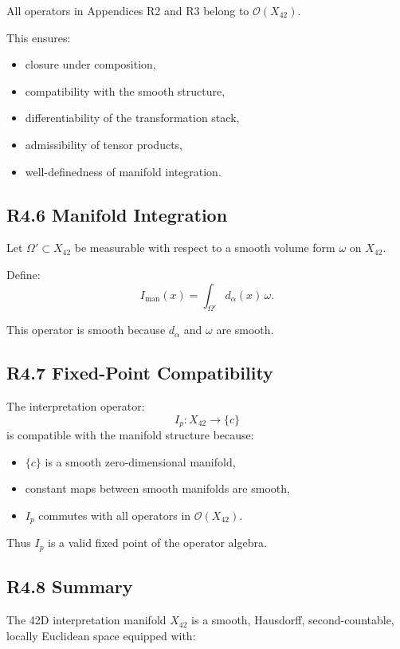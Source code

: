 All operators in Appendices R2 and R3 belong to $\mathcal{O}(X_{42})$.

This ensures:

\begin{itemize}
    \item closure under composition,
    \item compatibility with the smooth structure,
    \item differentiability of the transformation stack,
    \item admissibility of tensor products,
    \item well-definedness of manifold integration.
\end{itemize}

\subsection*{R4.6 Manifold Integration}

Let $\Omega' \subset X_{42}$ be measurable with respect to a smooth
volume form $\omega$ on $X_{42}$.

Define:
\[
I_{\mathrm{man}}(x)
=
\int_{\Omega'} d_{\alpha}(x)\, \omega.
\]

This operator is smooth because $d_{\alpha}$ and $\omega$ are smooth.

\subsection*{R4.7 Fixed-Point Compatibility}

The interpretation operator:
\[
I_p : X_{42} \to \{c\}
\]
is compatible with the manifold structure because:

\begin{itemize}
    \item $\{c\}$ is a smooth zero-dimensional manifold,
    \item constant maps between smooth manifolds are smooth,
    \item $I_p$ commutes with all operators in $\mathcal{O}(X_{42})$.
\end{itemize}

Thus $I_p$ is a valid fixed point of the operator algebra.

\subsection*{R4.8 Summary}

The 42D interpretation manifold $X_{42}$ is a smooth, Hausdorff,
second-countable, locally Euclidean space equipped with:

